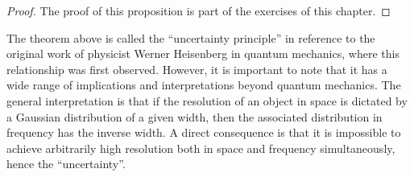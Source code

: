 \begin{proof}
  The proof of this proposition is part of the exercises of this chapter.
\end{proof}
The theorem above is called the ``uncertainty principle'' in reference to the original
work of physicist Werner Heisenberg in quantum mechanics, where this relationship was
first observed. However, it is important to note that it has a wide range of implications
and interpretations beyond quantum mechanics. The general interpretation is that if the
resolution of an object in space is dictated by a Gaussian distribution of a given width,
then the associated distribution in frequency has the inverse width. A direct consequence
is that it is impossible to achieve arbitrarily high resolution both in space and
frequency simultaneously, hence the ``uncertainty''.
